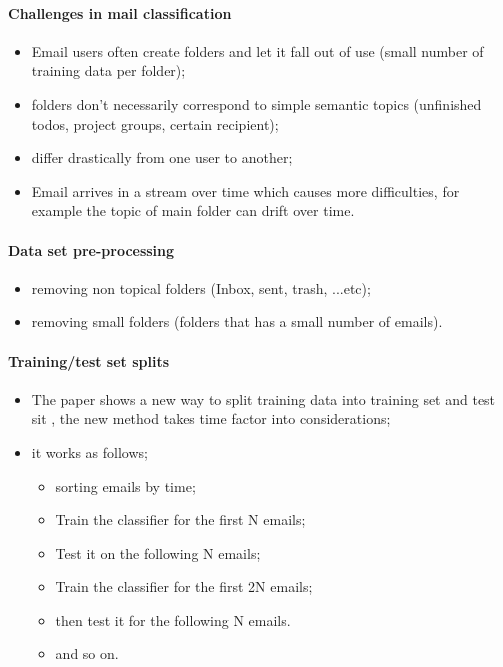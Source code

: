 \documentclass[12pt]{article}
\begin{document}
\paragraph{Challenges in mail classification}
\begin{itemize}
  \item Email users often create folders and let it fall out of use 
	(small number of training data per folder);
  \item folders don’t necessarily correspond to simple semantic topics 
	(unfinished todos, project groups, certain recipient);
  \item differ drastically from one user to another;
  \item Email arrives in a stream over time which causes more difficulties, 
	for example the topic of main folder can drift over time.
\end{itemize}


\paragraph{Data set pre-processing}
\begin{itemize}
    \item removing non topical folders (Inbox, sent, trash, ...etc);
    \item removing small folders (folders that has a small number of emails).
\end{itemize}

\paragraph{Training/test set splits}
\begin{itemize}
    \item The paper shows a new way to split training data into training set 
	  and test sit , the new method takes time factor into considerations;
    \item it works as follows;
    \begin{itemize}
        \item sorting emails by time;
        \item Train the classifier for the first N emails;
        \item Test it on the following N emails;
        \item Train the classifier for the first 2N emails;
        \item then test it for the following N emails.
        \item and so on.
    \end{itemize}
\end{itemize}
\end{document}
